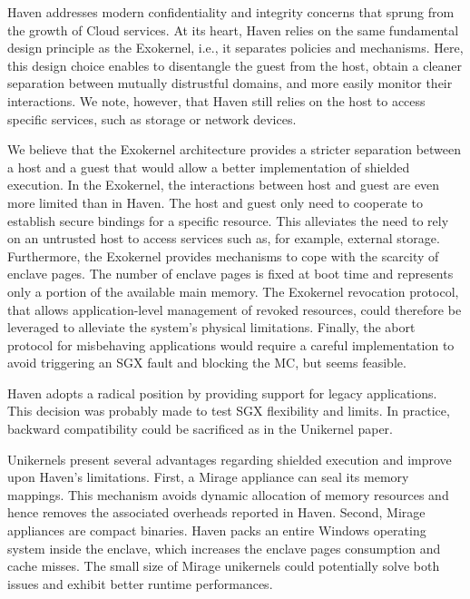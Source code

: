 Haven addresses modern confidentiality and integrity concerns that sprung from the growth of Cloud services.
At its heart, Haven relies on the same fundamental design principle as the Exokernel, i.e., it separates policies and mechanisms.
Here, this design choice enables to disentangle the guest from the host, obtain a cleaner separation between mutually distrustful domains, and more easily monitor their interactions.
We note, however, that Haven still relies on the host to access specific services, such as storage or network devices.

We believe that the Exokernel architecture provides a stricter separation between a host and a guest that would allow a better implementation of shielded execution.
In the Exokernel, the interactions between host and guest are even more limited than in Haven.
The host and guest only need to cooperate to establish secure bindings for a specific resource.
This alleviates the need to rely on an untrusted host to access services such as, for example, external storage.
Furthermore, the Exokernel provides mechanisms to cope with the scarcity of enclave pages.
The number of enclave pages is fixed at boot time and represents only a portion of the available main memory.
The Exokernel revocation protocol, that allows application-level management of revoked resources, could therefore be leveraged to alleviate the system's physical limitations.
Finally, the abort protocol for misbehaving applications would require a careful implementation to avoid triggering an SGX fault and blocking the MC, but seems feasible.

Haven adopts a radical position by providing support for legacy applications.
This decision was probably made to test SGX flexibility and limits.
In practice, backward compatibility could be sacrificed as in the Unikernel paper.

Unikernels present several advantages regarding shielded execution and improve upon Haven's limitations.
First, a Mirage appliance can seal its memory mappings.
This mechanism avoids dynamic allocation of memory resources and hence removes the associated overheads reported in Haven.
Second, Mirage appliances are compact binaries.
Haven packs an entire Windows operating system inside the enclave, which increases the enclave pages consumption and cache misses.
The small size of Mirage unikernels could potentially solve both issues and exhibit better runtime performances.




